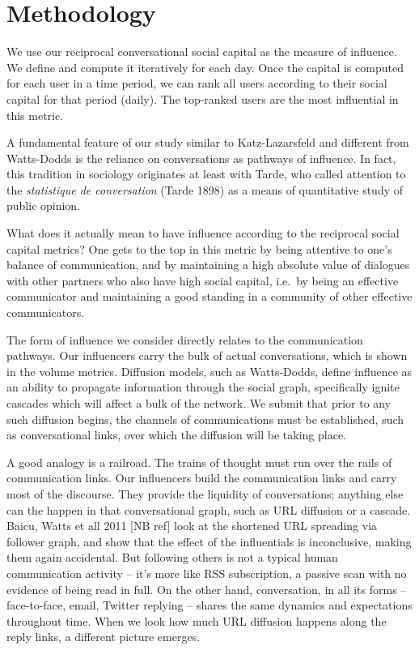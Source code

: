 \documentclass[10pt,oneside]{memoir}
\begin{document}
\pagebreak \section{Methodology}
\label{methodology}

We use our reciprocal conversational social capital as the measure of influence.  We define and compute it iteratively for each day.  Once the capital is computed for each user in a time period,  we can rank all users according to their social capital for that period (daily).  The top-ranked users are the most influential in this metric.


A fundamental feature of our study similar to Katz-Lazarsfeld and different from Watts-Dodds is the reliance on conversations as pathways of influence.  In fact, this tradition in sociology originates at least with Tarde, who called attention to  the \emph{statistique de conversation} (Tarde 1898) as a means of quantitative study of public opinion.


What does it actually mean to have influence according to the reciprocal social capital metrics?  One gets to the top in this metric by being attentive to one's balance of communication, and by maintaining a high absolute value of dialogues with other partners who also have high social capital, i.e.\ by being an effective communicator and maintaining a good standing in a community of other effective communicators.


The form of influence we consider directly relates to the communication pathways.  Our influencers carry the bulk of actual conversations, which is shown in the volume metrics.  Diffusion models, such as Watts-Dodds, define influence as an ability to propagate information through the social graph, specifically ignite cascades which will affect a bulk of the network.  We submit that prior to any such diffusion begins, the channels of communications must be established, such as conversational links, over which the diffusion will be taking place.


A good analogy is a railroad.  The trains of thought must run over the rails of communication links. Our influencers build the communication links and carry most of the discourse.  They provide the liquidity of conversations; anything else can the happen in that conversational graph, such as URL diffusion or a cascade.   Baicu, Watts et all 2011 [NB ref] look at the shortened URL spreading via follower graph, and show that the effect of the influentials is inconclusive, making them again accidental.  But following others is not a typical human communication activity -- it's more like RSS subscription, a passive scan with no evidence of being read in full.  On the other hand, conversation, in all its forms -- face-to-face, email, Twitter replying -- shares the same dynamics and expectations throughout time.  When we look how much URL diffusion happens along the reply links, a different picture emerges.
\end{document}
